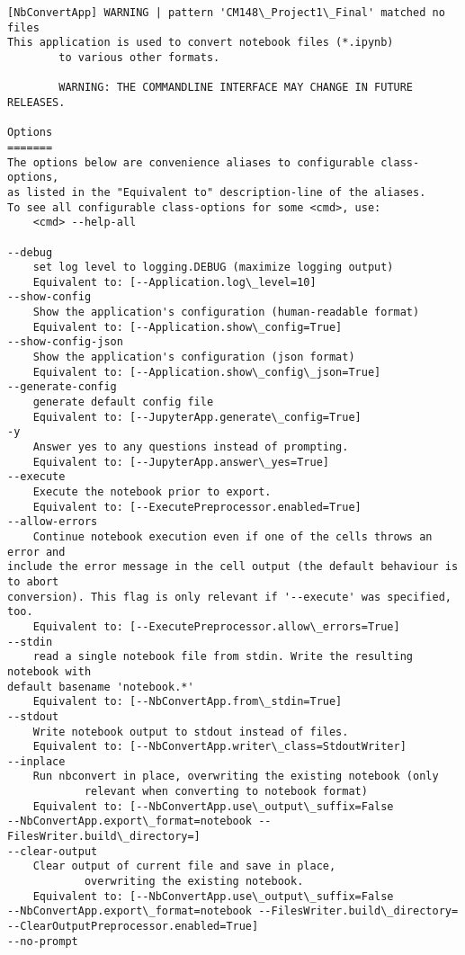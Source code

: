 \documentclass[11pt]{article}
\begin{document}
    \begin{Verbatim}[commandchars=\\\{\}]
[NbConvertApp] WARNING | pattern 'CM148\_Project1\_Final' matched no files
This application is used to convert notebook files (*.ipynb)
        to various other formats.

        WARNING: THE COMMANDLINE INTERFACE MAY CHANGE IN FUTURE RELEASES.

Options
=======
The options below are convenience aliases to configurable class-options,
as listed in the "Equivalent to" description-line of the aliases.
To see all configurable class-options for some <cmd>, use:
    <cmd> --help-all

--debug
    set log level to logging.DEBUG (maximize logging output)
    Equivalent to: [--Application.log\_level=10]
--show-config
    Show the application's configuration (human-readable format)
    Equivalent to: [--Application.show\_config=True]
--show-config-json
    Show the application's configuration (json format)
    Equivalent to: [--Application.show\_config\_json=True]
--generate-config
    generate default config file
    Equivalent to: [--JupyterApp.generate\_config=True]
-y
    Answer yes to any questions instead of prompting.
    Equivalent to: [--JupyterApp.answer\_yes=True]
--execute
    Execute the notebook prior to export.
    Equivalent to: [--ExecutePreprocessor.enabled=True]
--allow-errors
    Continue notebook execution even if one of the cells throws an error and
include the error message in the cell output (the default behaviour is to abort
conversion). This flag is only relevant if '--execute' was specified, too.
    Equivalent to: [--ExecutePreprocessor.allow\_errors=True]
--stdin
    read a single notebook file from stdin. Write the resulting notebook with
default basename 'notebook.*'
    Equivalent to: [--NbConvertApp.from\_stdin=True]
--stdout
    Write notebook output to stdout instead of files.
    Equivalent to: [--NbConvertApp.writer\_class=StdoutWriter]
--inplace
    Run nbconvert in place, overwriting the existing notebook (only
            relevant when converting to notebook format)
    Equivalent to: [--NbConvertApp.use\_output\_suffix=False
--NbConvertApp.export\_format=notebook --FilesWriter.build\_directory=]
--clear-output
    Clear output of current file and save in place,
            overwriting the existing notebook.
    Equivalent to: [--NbConvertApp.use\_output\_suffix=False
--NbConvertApp.export\_format=notebook --FilesWriter.build\_directory=
--ClearOutputPreprocessor.enabled=True]
--no-prompt

\end{Verbatim}
\end{document}
